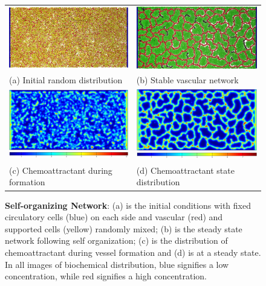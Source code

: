 \begin{figure}[t]
 \begin{center}
  \begin{tabular}{m{6cm}m{6cm}}
   \includegraphics[width=5.9cm]{./figures/init_state.png} &
   \includegraphics[width=5.9cm]{./figures/vessel30.png}\\
   (a) Initial random distribution & (b) Stable vascular network \\
   \includegraphics[width=5.9cm]{./figures/Chemo_init_state.png} \hspace{50mm} &
   \includegraphics[width=5.9cm]{./figures/Chemo_steady_state.png} \hspace{50mm}\\
   (c) Chemoattractant during formation & (d) Chemoattractant state distribution \\
   \end{tabular}
   \end{center}
 \caption{\textbf{Self-organizing Network}: (a) is the initial conditions with fixed circulatory cells (blue) on each side and vascular (red) and supported cells (yellow) randomly mixed; (b) is the steady state network following self organization; (c) is the distribution of chemoattractant during vessel formation and (d) is at a steady state. In all images of biochemical distribution, blue signifies a low concentration, while red signifies a high concentration.}
 \vspace{+1mm}
\label{phaseOne}
\end{figure} 